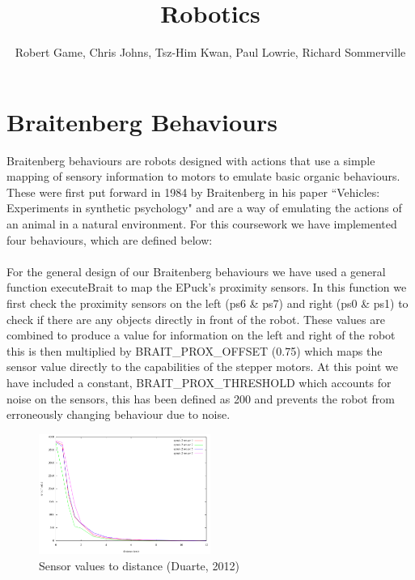 \documentclass[11pt]{article}
\begin{document}
\title{Robotics}
\author{Robert Game, Chris Johns, Tsz-Him Kwan, Paul Lowrie, Richard Sommerville}
\date{}
\maketitle

\section*{Braitenberg Behaviours}

Braitenberg behaviours are robots designed with actions that use a simple mapping of sensory information to motors to emulate basic organic behaviours. These were first put forward in 1984 by Braitenberg in his paper “Vehicles: Experiments in synthetic psychology" and are a way of emulating the actions of an animal in a natural environment. For this coursework we have implemented four behaviours, which are defined below:
\\
\\
For the general design of our Braitenberg behaviours we have used a general function \- executeBrait to map the E\-Puck’s proximity sensors. In this function we first check the proximity sensors on the left (ps6 \& ps7) and right (ps0 \& ps1) to check if there are any objects directly in front of the robot. These values are combined to produce a value for information on the left and right of the robot \- this is then multiplied by BRAIT\_PROX\_OFFSET (0.75) which maps the sensor value directly to the capabilities of the stepper motors. At this point we have included a constant, BRAIT\_PROX\_THRESHOLD which accounts for noise on the sensors, this has been defined as 200 and prevents the robot from erroneously changing behaviour due to noise.

\begin{figure}[h]
\begin{center}
\includegraphics[width=0.5\textwidth]{epuck-2-proximity.png}
\caption{Sensor values to distance (Duarte, 2012)}
\end{center}
\end{figure}
\end{document}
